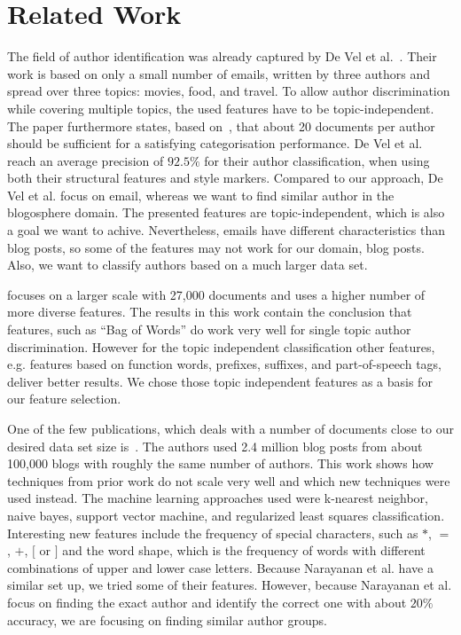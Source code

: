 
\section{Related Work}
\label{sec:related}


The field of author identification was already captured by De Vel et al.~\cite{de2001mining}.
Their work is based on only a small number of emails, written by three authors and spread over three topics: movies, food, and travel.
To allow author discrimination while covering multiple topics, the used features have to be topic-independent.
The paper furthermore states, based on~\cite{corney2001identifying}, that about 20 documents per author should be sufficient for a satisfying categorisation performance.
De Vel et al. reach an average precision of $92.5\%$ for their author classification, when using both their structural features and style markers.
Compared to our approach, De Vel et al. focus on email, whereas we want to find similar author in the blogosphere domain.
The presented features are topic-independent, which is also a goal we want to achive.
Nevertheless, emails have different characteristics than blog posts, so some of the features may not work for our domain, blog posts.
Also, we want to classify authors based on a much larger data set.


\cite{madigan2005author} focuses on a larger scale with 27,000 documents and uses a higher number of more diverse features.
The results in this work contain the conclusion that features, such as ``Bag of Words'' do work very well for single topic author discrimination.
However for the topic independent classification other features, e.g. features based on function words, prefixes, suffixes, and part-of-speech tags, deliver better results.
We chose those topic independent features as a basis for our feature selection.


One of the few publications, which deals with a number of documents close to our desired data set size is~\cite{narayanan2012feasibility}.
The authors used 2.4 million blog posts from about 100,000 blogs with roughly the same number of authors.
This work shows how techniques from prior work do not scale very well and which new techniques were used instead.
The machine learning approaches used were k-nearest neighbor, naive bayes, support vector machine, and regularized least squares classification.
Interesting new features include the frequency of special characters, such as $*$, $=$, $+$, $[$ or $]$ and the word shape, which is the frequency of words with different combinations of upper and lower case letters.
Because Narayanan et al. have a similar set up, we tried some of their features.
However, because Narayanan et al. focus on finding the exact author and identify the correct one with about $20\%$ accuracy, we are focusing on finding similar author groups.


